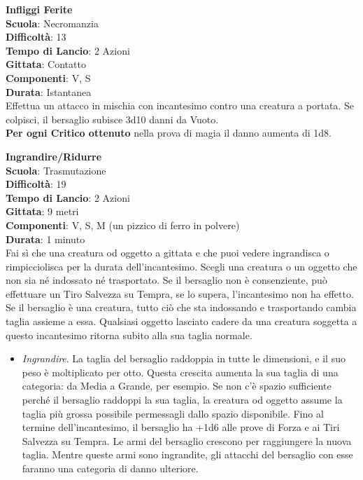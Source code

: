 \begin{multicols}{2}
\medskip\textbf{Infliggi Ferite}\\
\textbf{Scuola}: Necromanzia\\
\textbf{Difficoltà}: 13 \\
\textbf{Tempo di Lancio}: 2 Azioni\\
\textbf{Gittata}: Contatto\\
\textbf{Componenti}: V, S\\
\textbf{Durata}: Istantanea\\
Effettua un attacco in mischia con incantesimo contro una creatura a portata. Se colpisci, il bersaglio subisce 3d10 danni da Vuoto.\\
\textbf{Per ogni Critico ottenuto} nella prova di magia il danno aumenta di 1d8.

\medskip\textbf{Ingrandire/Ridurre}\\
\textbf{Scuola}: Trasmutazione\\
\textbf{Difficoltà}: 19\\
\textbf{Tempo di Lancio}: 2 Azioni\\
\textbf{Gittata}: 9 metri\\
\textbf{Componenti}: V, S, M (un pizzico di ferro in polvere)\\
\textbf{Durata}: 1 minuto\\
Fai sì che una creatura od oggetto a gittata e che puoi vedere ingrandisca o rimpicciolisca per la durata dell'incantesimo. Scegli una creatura o un oggetto che non sia né indossato né trasportato. Se il bersaglio non è consenziente, può effettuare un Tiro Salvezza su Tempra, se lo supera, l'incantesimo non ha effetto. Se il bersaglio è una creatura, tutto ciò che sta indossando e trasportando cambia taglia assieme a essa. Qualsiasi oggetto lasciato cadere da una creatura soggetta a questo incantesimo ritorna subito alla sua taglia normale.\\
\medskip
\begin{itemize}
\item
\textit{Ingrandire}. La taglia del bersaglio raddoppia in tutte le dimensioni, e il suo peso è moltiplicato per otto. Questa crescita aumenta la sua taglia di una categoria: da Media a Grande, per esempio. Se non c'è spazio sufficiente perché il bersaglio raddoppi la sua taglia, la creatura od oggetto assume la taglia più grossa possibile permessagli dallo spazio disponibile. Fino al termine dell'incantesimo, il bersaglio ha +1d6 alle prove di Forza e ai Tiri Salvezza su Tempra. Le armi del bersaglio crescono per raggiungere la nuova taglia. Mentre queste armi sono ingrandite, gli attacchi del bersaglio con esse faranno una categoria di danno ulteriore. 

\end{itemize}
\end{multicols}
